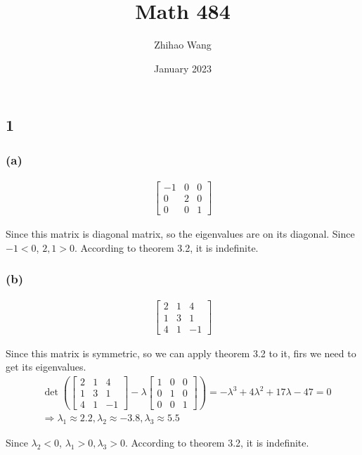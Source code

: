 \documentclass{article}
\title{Math 484}
\author{Zhihao Wang}
\date{January 2023}
\def\implies{\Longrightarrow}
\begin{document}
\maketitle

\subsection*{1}
\subsubsection*{(a)}
\[
\begin{split}
\begin{bmatrix} -1 & 0 & 0 \\ 0 & 2 & 0 \\ 0 & 0 & 1\end{bmatrix}
\end{split}
\]

Since this matrix is diagonal matrix, so the eigenvalues are on its diagonal. Since $-1 < 0$, $2, 1 > 0$. According to theorem 3.2, it is indefinite. 
\subsubsection*{(b)}
\[
\begin{split}
\begin{bmatrix} 2 & 1 & 4 \\ 1 & 3 & 1 \\ 4 & 1 & -1\end{bmatrix}
\end{split}
\]

Since this matrix is symmetric, so we can apply theorem 3.2 to it, firs we need to get its eigenvalues.
\[
\begin{split}
& \det(\begin{bmatrix} 2 & 1 & 4 \\ 1 & 3 & 1 \\ 4 & 1 & -1\end{bmatrix} - \lambda \begin{bmatrix} 1 & 0 & 0 \\ 0 & 1 & 0 \\ 0 & 0 & 1\end{bmatrix}) = -\lambda^3+4\lambda^2+17\lambda-47 = 0 \\ & \implies \lambda_1 \approx 2.2 , \lambda_2 \approx -3.8, \lambda_3 \approx 5.5
\end{split}
\]

Since $\lambda_2 < 0$, $\lambda_1 > 0 , \lambda_3 > 0$. According to theorem 3.2, it is indefinite. 
\end{document}
